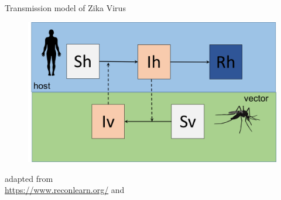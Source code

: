 \documentclass[table]{beamer}\usepackage[]{graphicx}\usepackage[]{color}
\begin{document}
\begin{frame}[fragile]{Transmission model of Zika Virus}
\begin{minipage}{.45\textwidth}
\end{minipage}
\hfill
\begin{minipage}{.52\textwidth}
\vspace{1.5cm}
\begin{figure}
  \hfill \includegraphics[width=\textwidth,height=\textheight,keepaspectratio]{SImodel.png}
\end{figure}
\vspace{1cm} {\raggedright\tiny adapted from\\ \url{https://www.reconlearn.org/} and ~\cite{ferguson2016} \par}
\end{minipage}

\end{frame}
\end{document}
